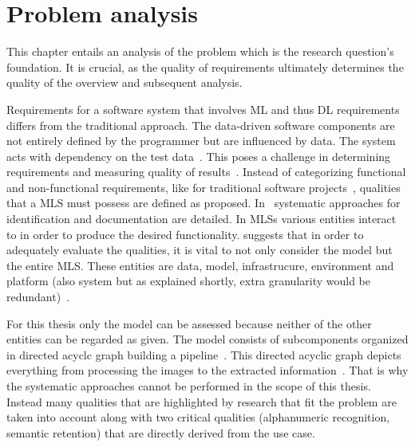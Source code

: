 \chapter{Problem analysis}\label{ch:problem}
This chapter entails an analysis of the problem which is the research question's foundation.
It is crucial, as the quality of requirements ultimately determines the quality of the overview and
subsequent analysis.

Requirements for a software system that involves \ac{ML} and thus \ac{DL} requirements differs from
the traditional approach. The data-driven software components are not entirely defined by the programmer
but are influenced by data.
The system acts with dependency on the test data~\citep{siebert_construction_2021}.
This poses a challenge in determining requirements and measuring quality of
results~\citep{nakamichi_requirements-driven_2020}.
Instead of categorizing functional and non-functional requirements, like for traditional
software projects~\citep{zowghi_requirements_2014}, qualities that a \ac{MLS} must possess
are defined as proposed.
In~\cite{nakamichi_requirements-driven_2020,siebert_construction_2021} systematic approaches for
identification and documentation are detailed.
In \acp{MLS} various entities interact to in order to produce the desired functionality.
\cite{nakamichi_requirements-driven_2020} suggests that in order to adequately evaluate the qualities,
it is vital to not only consider the model but the entire \ac{MLS}.
These entities are data, model, infrastrucure, environment and platform (also system but as explained
shortly, extra granularity would be redundant)~\citep{nakamichi_requirements-driven_2020,
siebert_construction_2021}.

For this thesis only the model can be assessed because neither of the other entities can be regarded
as given.
The model consists of subcomponents organized in directed acyclc graph building a
pipeline~\citep{siebert_construction_2021}.
This directed acyclic graph depicts everything from processing the images to the extracted
information~\citep{siebert_construction_2021}.
That is why the systematic approaches cannot be performed in the scope of this thesis.
Instead many qualities that are highlighted by research that fit the problem are taken into account
along with two critical qualities (alphanumeric recognition, semantic retention) that are directly
derived from the use case.

